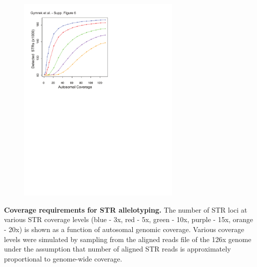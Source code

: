 {\begin{figure}[h!]
\centering
\label{fig:lobsup6}
\includegraphics[width=0.7\textwidth]{Figures/Chapter2/SuppFig6.pdf}
\end{figure}
\textbf{Coverage requirements for STR allelotyping.} The number of STR loci at various STR coverage levels (blue - 3x, red - 5x, green - 10x, purple - 15x, orange - 20x) is shown as a function of autosomal genomic coverage. Various coverage levels were simulated by sampling from the aligned reads file of the 126x genome under the assumption that number of aligned STR reads is approximately proportional to genome-wide coverage.

\pagebreak
}
